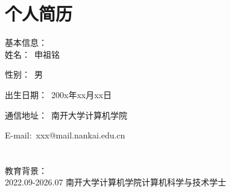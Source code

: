 

\chapter*{个人简历}

\noindent 基本信息：\\

 姓名：~申祖铭

 性别：~男

 出生日期：~200x年xx月xx日

 通信地址：~南开大学计算机学院

 E-mail:~xxx@mail.nankai.edu.cn \\ \\
\\
教育背景：\\

2022.09-2026.07 \quad 南开大学\quad 计算机学院\quad\quad 计算机科学与技术\quad\quad 学士 \\
\\
